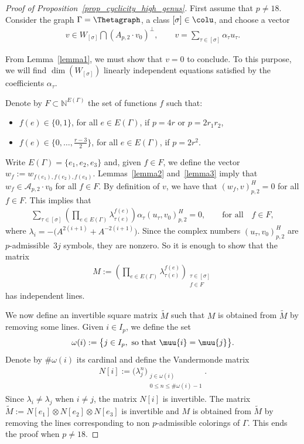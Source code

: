 \begin{proof}[Proof of Proposition~\ref{prop_cyclicity_high_genus}]First assume that $p\neq 18$. Consider the graph $\Gamma=\Thetagraph$, a class $[\sigma]\in \colu$, and choose a vector
\begin{gather*}
 v \in W_{[\sigma]}\bigcap \left( A_{p,2}\cdot v_0\right)^{\bot},\qquad v = \sum_{\tau\in [\sigma]}{\alpha_{\tau}u_{\tau}}.
\end{gather*}

From Lemma~\ref{lemma1}, we must show that $v=0$ to conclude. To this purpose, we will find $\dim \left(W_{[\sigma]}\right)$ linearly independent equations satisfied by the coefficients $\alpha_{\tau}$.

Denote by $F\subset \mathbb{N}^{E(\Gamma)}$ the set of functions $f$ such that:
\begin{itemize}\itemsep=0pt
\item $f(e) \in \{0,1\}$, for all $e\in E(\Gamma)$, if $p=4r$ or $p=2r_1r_2$,
\item $f(e) \in \big\{ 0, \ldots, \frac{r-3}{2} \big\}$, for all $e \in E(\Gamma)$, if $p=2r^2$.
\end{itemize}
Write $E(\Gamma)=\{e_1, e_2, e_3\}$ and, given $f\in F$, we define the vector $w_f:= w_{f(e_1), f(e_2), f(e_3)}$. Lemmas~\ref{lemma2} and~\ref{lemma3} imply that $w_f\in \mathcal{A}_{p,2}\cdot v_0$ for all $f\in F$. By definition of $v$, we have that $(w_f, v)_{p,2}^H = 0$ for all $f\in F$. This implies that
\begin{gather*}
 \sum_{\tau\in [\sigma]}{\left( \prod_{e\in E(\Gamma)}{\lambda_{\tau(e)}^{f(e)}}\right) \alpha_{\tau} \left( u_{\tau}, v_0 \right)_{p,2}^H } =0, \qquad \text{for all} \quad f\in F,
\end{gather*}
where $\lambda_i = -\big(A^{2(i+1)}+A^{-2(i+1)}\big)$. Since the complex numbers $( u_{\tau}, v_0)_{p,2}^H$ are $p$-admissible~$3j$ symbols, they are nonzero. So it is enough to show that the matrix
\begin{gather*} M := \left(\prod_{e\in E(\Gamma)}{\lambda_{\tau(e)}^{f(e)}}\right)_{\substack{\tau\in[\sigma] \\ f\in F}} \end{gather*}
has independent lines.

We now define an invertible square matrix $\widetilde{M}$ such that $M$ is obtained from $\widetilde{M}$ by removing some lines. Given $i\in I_p$, we define the set
\begin{gather*} \omega(i) := \big\{ j\in I_p, \mbox{ so that }\muu{i}=\muu{j} \big\}.\end{gather*}
Denote by $\# \omega(i)$ its cardinal and define the Vandermonde matrix
\begin{gather*} N[i] := \big( \lambda_j^n \big) _{\substack{ j \in \omega(i)\\ 0\leq n \leq \# \omega(i) -1 }}.\end{gather*}
Since $\lambda_i\neq \lambda_j$ when $i\neq j $, the matrix $N[i]$ is invertible. The matrix $ \widetilde{M} := N[e_1]\otimes N[e_2] \otimes N[e_3]$ is invertible and $M$ is obtained from $\widetilde{M}$ by removing the lines corresponding to non $p$-admissible colorings of $\Gamma$. This ends the proof when $p\neq 18$.


\end{proof}
